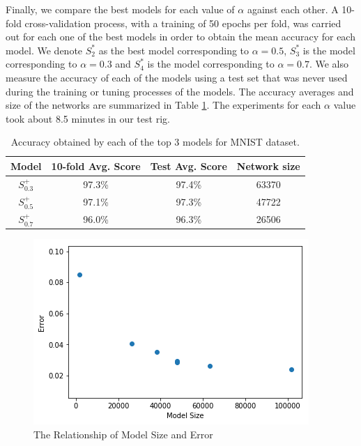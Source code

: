 \documentclass[journal]{IEEEtran}
\begin{document}
Finally, we compare the best models for each value of $\alpha$ against each other. A 10-fold cross-validation process, with a training of 50 epochs per fold, was carried out for each one of the best models in order to obtain the mean accuracy for each model. We denote $ S^*_2$ as the best model corresponding to $\alpha = 0.5$, $S^*_3$ is the model corresponding to $\alpha = 0.3$ and $S^*_4$ is the model corresponding to $\alpha = 0.7$. We also measure the accuracy of each of the models using a test set that was never used during the training or tuning processes of the models. The accuracy averages and size of the networks are summarized in Table \ref{table:avg_accuracies_mnist}. The experiments for each $\alpha$ value took about 8.5 minutes in our test rig.

\begin{table}[!htb]
\begin{center}
\begin{tabular}{| c | c | c | c |}
\hline
Model & 10-fold Avg. Score & Test Avg. Score & Network size\\
\hline
$S^+_{0.3}$ & 97.3\% & 97.4\% & 63370\\
$S^+_{0.5}$ & 97.1\% & 97.3\% & 47722\\
$S^+_{0.7}$ & 96.0\% & 96.3\% & 26506\\
\hline
\end{tabular}
\end{center}
\caption{Accuracy obtained by each of the top 3 models for MNIST dataset.}
\label{table:avg_accuracies_mnist}
\end{table}
\begin{figure}[H]
	\begin{center}
		\centering
		\includegraphics[scale=0.55]{mnist_scatter.png}
		\caption{The Relationship of Model Size and Error}
		\label{fig:mnist_scatter}
	\end{center}
\end{figure}
\end{document}
